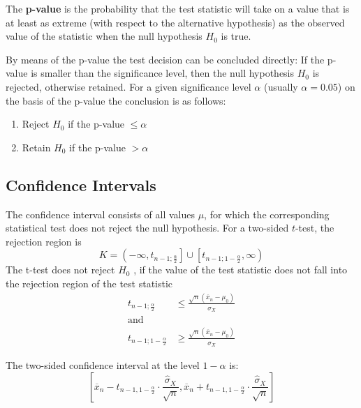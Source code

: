 \documentclass[11pt]{article}
\theoremstyle{definition}
\newcommand*\samplemean[1]{\overline{#1}}
\begin{document}
\begin{definition}
	The \textbf{p-value} is the probability that the test statistic will take on a value that is at least as extreme (with respect to the alternative hypothesis) as the observed value of the statistic when the null hypothesis $H_0$ is true.
	
	By means of the p-value the test decision can be concluded directly: If the p-value is smaller than the significance level, then the null hypothesis $H_0$ is rejected, otherwise retained. For a given significance level $\alpha$ (usually $\alpha = 0.05$) on the basis of the p-value the conclusion is as follows:
	\begin{enumerate}
		\item Reject $H_0$ if the p-value $\leq \alpha$
		\item Retain $H_0$ if the p-value $> \alpha$
	\end{enumerate}
\end{definition}

\subsection{Confidence Intervals}
The confidence interval consists of all values $\mu$, for which the corresponding statistical test does not reject the null hypothesis. For a two-sided $t$-test, the rejection region is
\begin{equation*}
	K = \left( -\infty, t_{n-1; \frac{\alpha}{2}} \right] \cup \left[ t_{n-1; 1- \frac{\alpha}{2}}, \infty \right)
\end{equation*}
The t-test does not reject $H_0$ , if the value of the test statistic does not fall into the rejection region of the test statistic
\begin{align*}
	t_{n-1; \frac{\alpha}{2}} &\leq \frac{\sqrt{n}(\samplemean{x}_n - \mu_0)}{\widehat{\sigma}_X}\\
	\text{and } &\\
	t_{n-1; 1 - \frac{\alpha}{2}} &\geq \frac{\sqrt{n}(\samplemean{x}_n - \mu_0)}{\widehat{\sigma}_X}
\end{align*}

\begin{definition}
	The two-sided confidence interval at the level $1-\alpha$ is:
	\begin{equation*}
		\left[ \samplemean{x}_n - t_{n-1,1-\frac{\alpha}{2}}\cdot\frac{\widehat{\sigma}_X}{\sqrt{n}}, \samplemean{x}_n + t_{n-1,1-\frac{\alpha}{2}}\cdot\frac{\widehat{\sigma}_X}{\sqrt{n}} \right]
	\end{equation*}
\end{definition}
\end{document}
